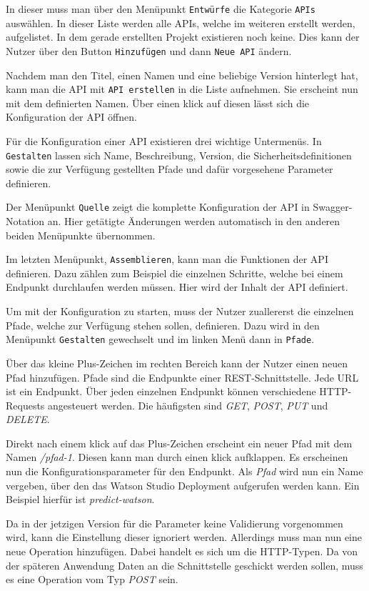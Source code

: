 In dieser muss man über den Menüpunkt \texttt{Entwürfe} die Kategorie \texttt{APIs} auswählen. In dieser Liste werden
alle APIs, welche im weiteren erstellt werden, aufgelistet. In dem gerade erstellten Projekt existieren noch keine. Dies
kann der Nutzer über den Button \texttt{Hinzufügen} und dann \texttt{Neue API} ändern.

Nachdem man den Titel, einen Namen und eine beliebige Version hinterlegt hat, kann man die API mit \texttt{API erstellen}
in die Liste aufnehmen. Sie erscheint nun mit dem definierten Namen. Über einen klick auf diesen lässt sich die
Konfiguration der API öffnen.

Für die Konfiguration einer API existieren drei wichtige Untermenüs. In \texttt{Gestalten} lassen sich Name, Beschreibung,
Version, die Sicherheitsdefinitionen sowie die zur Verfügung gestellten Pfade und dafür vorgesehene Parameter definieren.

Der Menüpunkt \texttt{Quelle} zeigt die komplette Konfiguration der API in Swagger-Notation an. Hier getätigte Änderungen
werden automatisch in den anderen beiden Menüpunkte übernommen.

Im letzten Menüpunkt, \texttt{Assemblieren}, kann man die Funktionen der API definieren. Dazu zählen zum Beispiel die
einzelnen Schritte, welche bei einem Endpunkt durchlaufen werden müssen. Hier wird der Inhalt der API definiert.

Um mit der Konfiguration zu starten, muss der Nutzer zuallererst die einzelnen Pfade, welche zur Verfügung stehen sollen,
definieren. Dazu wird in den Menüpunkt \texttt{Gestalten} gewechselt und im linken Menü dann in \texttt{Pfade}.

Über das kleine Plus-Zeichen im rechten Bereich kann der Nutzer einen neuen Pfad hinzufügen. Pfade sind die Endpunkte
einer REST-Schnittstelle. Jede URL ist ein Endpunkt. Über jeden einzelnen Endpunkt können verschiedene HTTP-Requests
angesteuert werden. Die häufigsten sind \textit{GET}, \textit{POST}, \textit{PUT} und \textit{DELETE}.

Direkt nach einem klick auf das Plus-Zeichen erscheint ein neuer Pfad mit dem Namen \textit{/pfad-1}. Diesen kann man
durch einen klick aufklappen. Es erscheinen nun die Konfigurationsparameter für den Endpunkt. Als \textit{Pfad} wird nun
ein Name vergeben, über den das Watson Studio Deployment aufgerufen werden kann. Ein Beispiel hierfür ist
\textit{predict-watson}.

Da in der jetzigen Version für die Parameter keine Validierung vorgenommen wird, kann die Einstellung dieser ignoriert
werden. Allerdings muss man nun eine neue Operation hinzufügen. Dabei handelt es sich um die HTTP-Typen. Da von der
späteren Anwendung Daten an die Schnittstelle geschickt werden sollen, muss es eine Operation vom Typ \textit{POST} sein.


